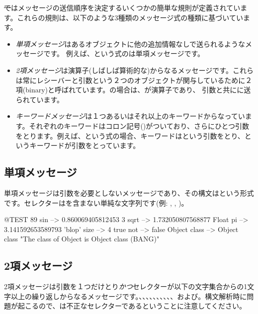 \documentclass[a4paper,10pt,twoside]{book}
\begin{document}
\st ではメッセージの送信順序を決定するいくつかの簡単な規則が定義されています。これらの規則は、以下のような3種類のメッセージ式の種類に基づいています。
\begin{itemize}
\item \emph{単項メッセージ}はあるオブジェクトに他の追加情報なしで送られるようなメッセージです。 例えば、という式のは単項メッセージです。
\item  \emph{2項メッセージ}は演算子(しばしば算術的な)からなるメッセージです。これらは常にレシーバーと引数という２つのオブジェクトが関与しているために２項(binary)と呼ばれています。の場合は、\ct{+}が演算子であり、 引数と共にに送られています。
\item  \emph{キーワードメッセージ}は１つあるいはそれ以上のキーワードからなっています。それぞれのキーワードはコロン記号(\ct{:})がついており、さらにひとつ引数をとります。例えば、という式の場合、キーワードはという引数をとり、というキーワードが引数をとっています。
\end{itemize}

\subsection{単項メッセージ}
単項メッセージは引数を必要としないメッセージであり、その構文はという形式です。セレクターは\ct{:}を含まない単純な文字列です(例: , , )。
\begin{code}{@TEST}
89 sin           --> 0.860069405812453
3 sqrt           --> 1.732050807568877
Float pi         --> 3.141592653589793
'blop' size     --> 4
true not        --> false
Object class --> Object class  "The class of Object is Object class (BANG)"
\end{code}


\subsection{2項メッセージ} 
2項メッセージは引数を１つだけとり\emph{かつ}セレクターが以下の文字集合からの1文字以上の繰り返しからなるメッセージです。\ct{+}、\ct{-}、\ct{*}、\ct{/}、\ct{\&}、\ct{=}、\ct{>}、\ct{|}、\ct{<}、\ct{\~}、および。構文解析時に問題が起こるので、\ct{--}は不正なセレクターであるということに注意してください。
\end{document}
